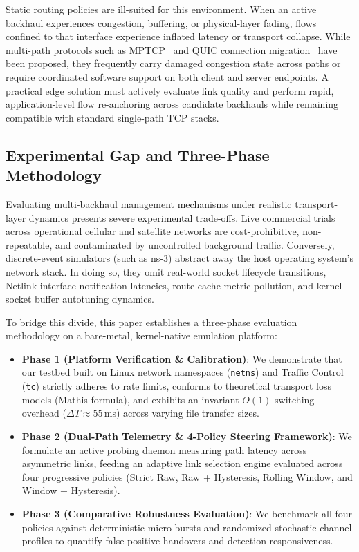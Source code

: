 \documentclass[conference]{IEEEtran}
\begin{document}
Static routing policies are ill-suited for this environment. When an active backhaul experiences congestion, buffering, or physical-layer fading, flows confined to that interface experience inflated latency or transport collapse. While multi-path protocols such as MPTCP~\cite{rfc8684_mptcp} and QUIC connection migration~\cite{de2020mptcp} have been proposed, they frequently carry damaged congestion state across paths or require coordinated software support on both client and server endpoints. A practical edge solution must actively evaluate link quality and perform rapid, application-level flow re-anchoring across candidate backhauls while remaining compatible with standard single-path TCP stacks.

\subsection{Experimental Gap and Three-Phase Methodology}
Evaluating multi-backhaul management mechanisms under realistic transport-layer dynamics presents severe experimental trade-offs. Live commercial trials across operational cellular and satellite networks are cost-prohibitive, non-repeatable, and contaminated by uncontrolled background traffic. Conversely, discrete-event simulators (such as ns-3) abstract away the host operating system's network stack. In doing so, they omit real-world socket lifecycle transitions, Netlink interface notification latencies, route-cache metric pollution, and kernel socket buffer autotuning dynamics.

To bridge this divide, this paper establishes a three-phase evaluation methodology on a bare-metal, kernel-native emulation platform:
\begin{itemize}
    \item \textbf{Phase 1 (Platform Verification \& Calibration)}: We demonstrate that our testbed built on Linux network namespaces (\texttt{netns}) and Traffic Control (\texttt{tc}) strictly adheres to rate limits, conforms to theoretical transport loss models (Mathis formula), and exhibits an invariant $O(1)$ switching overhead ($\Delta T \approx 55$\,ms) across varying file transfer sizes.
    \item \textbf{Phase 2 (Dual-Path Telemetry \& 4-Policy Steering Framework)}: We formulate an active probing daemon measuring path latency across asymmetric links, feeding an adaptive link selection engine evaluated across four progressive policies (Strict Raw, Raw + Hysteresis, Rolling Window, and Window + Hysteresis).
    \item \textbf{Phase 3 (Comparative Robustness Evaluation)}: We benchmark all four policies against deterministic micro-bursts and randomized stochastic channel profiles to quantify false-positive handovers and detection responsiveness.
\end{itemize}
\end{document}
